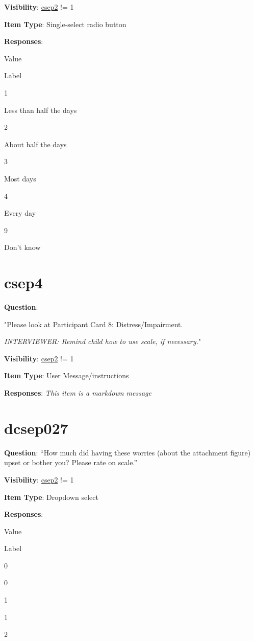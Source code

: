 \documentclass[]{book}
\begin{document}
\textbf{Visibility}: \protect\hyperlink{csep2}{csep2} != 1

\textbf{Item Type}: Single-select radio button

\textbf{Responses}:

Value

Label

1

Less than half the days

2

About half the days

3

Most days

4

Every day

9

Don't know

\hypertarget{csep4}{%
\section{csep4}\label{csep4}}

\textbf{Question}:

"Please look at Participant Card 8: Distress/Impairment.

\emph{INTERVIEWER: Remind child how to use scale, if necessary.}"

\textbf{Visibility}: \protect\hyperlink{csep2}{csep2} != 1

\textbf{Item Type}: User Message/instructions

\textbf{Responses}: \emph{This item is a markdown message}

\hypertarget{dcsep027}{%
\section{dcsep027}\label{dcsep027}}

\textbf{Question}: ``How much did having these worries (about the attachment figure) upset or bother you? Please rate on scale.''

\textbf{Visibility}: \protect\hyperlink{csep2}{csep2} != 1

\textbf{Item Type}: Dropdown select

\textbf{Responses}:

Value

Label

0

0

1

1

2
\end{document}
